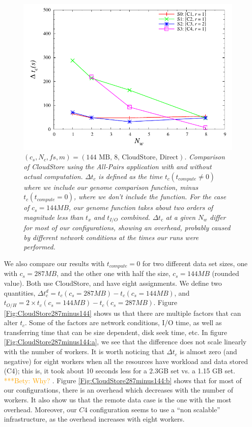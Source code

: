 \documentclass{rspublic}
\newcommand{\betynote}[1]{ {\textcolor{orange} { ***Bety: #1 }}}
\begin{document}
\begin{figure}
\begin{center}
\includegraphics[scale=0.5]{data/graphs/CloudStoreComputeMinusNoCompute144}
\caption{\textit{$(c_s, N_c, fs, m) = (\mbox{144 MB, 8, CloudStore, Direct})$. Comparison of CloudStore using the All-Pairs application with and without actual computation. $\Delta t_c$ is  defined as the time $t_c(t_{compute} \ne 0)$ where we include our genome comparison function, minus $t_c(t_{compute}=0)$, where we don't include the function. For the case of $c_s=144MB$, our genome function takes about two orders of magnitude less than $t_x$ and $t_{I/O}$ combined. $\Delta t_c$ at a given $N_w$ differ for most of our configurations, showing an overhead, probably caused by different network conditions at the times our runs were performed.}}
\label{Fig:experiment4}
\end{center}
\end{figure}

We also compare our results with $t_{compute}=0$ for two different data set sizes, one with $c_s = 287MB$, and the other one with half the size, $c_s = 144MB$ (rounded value). Both use CloudStore, and have eight assignments. We define two quantities, $\Delta t_c^d = t_c(c_s = 287MB) -  t_c(c_s = 144MB)$, and $t_{O/H} = 2 \times t_c(c_s = 144MB) - t_c(c_s = 287MB)$. Figure \ref{Fig:CloudStore287minus144} shows us that there are multiple factors that can alter $t_c$. Some of the factors are network conditions, I/O time, as well as transferring time that can be size dependent, disk seek time, etc. In figure \ref{Fig:CloudStore287minus144:a}, we see that the difference does not scale linearly with the number of workers. It is worth noticing that $\Delta t_c$ is almost zero (and negative) for eight workers when all the resources have workload and data stored (C4); this is, it took about 10 seconds less for a 2.3GB set vs. a 1.15 GB set. \betynote {Why?}.  Figure \ref{Fig:CloudStore287minus144:b} shows that for most of our configurations, there is an overhead which decreases with the number of workers. It also show us that the remote data case is the one with the most overhead. Moreover, our $C4$ configuration seems to use a ``non scalable'' infrastructure, as the overhead increases with eight workers.
\end{document}
